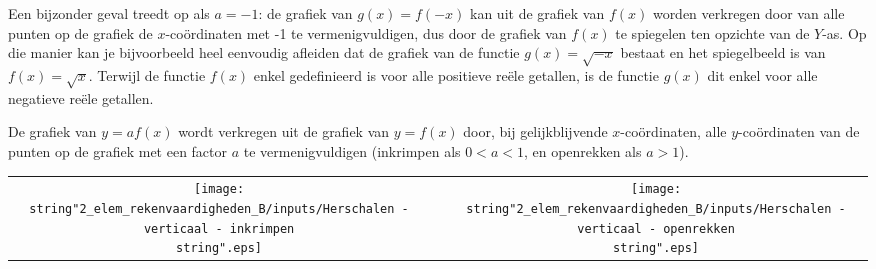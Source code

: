\noindent \medskip{}


\noindent Een bijzonder geval treedt op als $a=-1$: de grafiek van
$g(x)=f(-x)$ kan uit de grafiek van $f(x)$ worden verkregen door
van alle punten op de grafiek de $x$-co\"ordinaten met -1 te vermenigvuldigen,
dus door de grafiek van $f(x)$ te spiegelen ten opzichte van de $Y$-as.
Op die manier kan je bijvoorbeeld heel eenvoudig afleiden dat de grafiek
van de functie $g(x)=\sqrt{-x}$ bestaat en het spiegelbeeld is van
$f(x)=\sqrt{x}$. Terwijl de functie $f(x)$ enkel gedefinieerd is
voor alle positieve re\"ele getallen, is de functie $g(x)$ dit enkel
voor alle negatieve re\"ele getallen.

\medskip{}


\noindent De grafiek van $y=af(x)$ wordt verkregen uit de grafiek
van $y=f(x)$ door, bij gelijkblijvende $x$-co\"ordinaten, alle $y$-co\"ordinaten
van de punten op de grafiek met een factor $a$ te vermenigvuldigen
(inkrimpen als $0<a<1$, en openrekken als $a>1$).

\noindent \medskip{}


\begin{tabular}{ccc}
\texttt{[image: \\string"2\_elem\_rekenvaardigheden\_B/inputs/Herschalen - verticaal - inkrimpen\\string".eps]}  &  & \texttt{[image: \\string"2\_elem\_rekenvaardigheden\_B/inputs/Herschalen - verticaal - openrekken\\string".eps]} \tabularnewline
\end{tabular}\medskip{}

